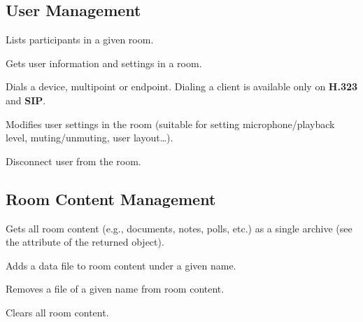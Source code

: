 \subsection{User Management}
\begin{Api}

Lists participants in a given room.

Gets user information and settings in a room.

Dials a device, multipoint or endpoint. Dialing a client is available only on \textbf{H.323} and \textbf{SIP}.

Modifies user settings in the room (suitable for setting
microphone/playback level, muting/unmuting, user layout\ldots).

Disconnect user from the room.

\end{Api}


\subsection{Room Content Management}
\begin{Api}

Gets all room content (e.g., documents, notes, polls, etc.) as a single archive (see the  attribute of the returned object).

Adds a data file to room content under a given name.

Removes a file of a given name from room content.

Clears all room content.

\end{Api}


